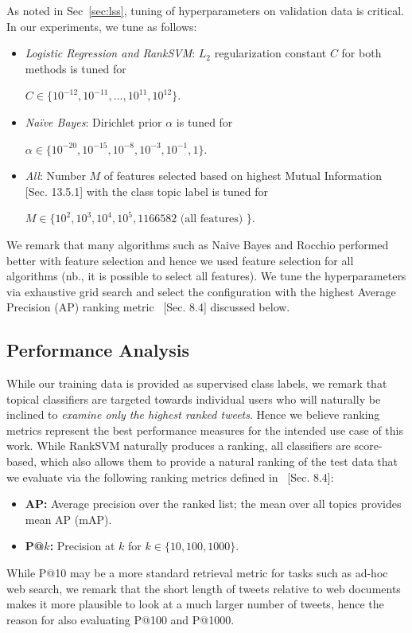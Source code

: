 \documentclass[letterpaper]{article}
\begin{document}
As noted in Sec~\ref{sec:lss}, tuning of hyperparameters on validation
data is critical.  In our experiments, we tune as follows: %
\begin{itemize}%
\item \textit{Logistic Regression and RankSVM}: $L_2$ regularization constant $C$ for both methods is tuned for 

$C \in \{10^{-12}, 10^{-11}, ..., 10^{11}, 10^{12} \}$.
\item \textit{Na\"{i}ve Bayes}: Dirichlet prior $\alpha$ is tuned for 

$\alpha \in \{10^{-20}, 10^{-15}, 10^{-8}, 10^{-3}, 10^{-1}, 1\}$.
\item \textit{All}: Number $M$ of features selected based on highest Mutual Information~\cite{manning_ir} [Sec. 13.5.1] with the class topic label is tuned for

 $M \in \{10^{2}, 10^{3}, 10^{4}, 10^{5}, 1166582 \textrm{ (all features) } \}$.
\end{itemize}
We remark that many algorithms such as Naive Bayes and Rocchio
performed better with feature selection and hence we used feature
selection for all algorithms (nb., it is possible to select all
features).  
We tune the hyperparameters via exhaustive grid search
and select the configuration with the highest Average Precision
(AP) ranking metric~\cite{manning_ir} [Sec. 8.4] discussed below.

\subsection{Performance Analysis}

While our training data
is provided as supervised class labels, we remark that topical classifiers
are targeted towards individual users who will naturally be inclined 
to \emph{examine only the highest ranked tweets}.  Hence we believe ranking
metrics represent the best performance measures for the intended use case of this work.
While RankSVM naturally produces a ranking, all classifiers are score-based, which also allows
them to provide a natural ranking of the test data that we evaluate via the following
ranking metrics defined in~\cite{manning_ir} [Sec. 8.4]:
\begin{itemize}
\item {\bf AP:} Average precision over the ranked list; the mean over
all topics provides mean AP (mAP).
\item {\bf P@$k$:} Precision at $k$ for $k \in \{ 10, 100, 1000 \}$.
\end{itemize}
While P@10 may be a more standard retrieval metric for tasks such
as ad-hoc web search, we remark that the short length of tweets relative
to web documents makes it more plausible to look at a much larger number
of tweets, hence the reason for also evaluating P@100 and P@1000.
\end{document}
